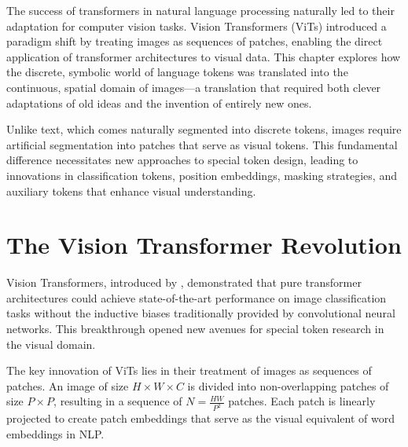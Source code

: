 
The success of transformers in natural language processing naturally led to their adaptation for computer vision tasks. Vision Transformers (ViTs) introduced a paradigm shift by treating images as sequences of patches, enabling the direct application of transformer architectures to visual data. This chapter explores how the discrete, symbolic world of language tokens was translated into the continuous, spatial domain of images---a translation that required both clever adaptations of old ideas and the invention of entirely new ones.
\begin{comment}
Feedback: This is a strong start. To make the core challenge more vivid, you could add a sentence like: "This chapter explores how the discrete, symbolic world of language tokens was translated into the continuous, spatial domain of images, a translation that required both clever adaptations of old ideas and the invention of entirely new ones."

STATUS: addressed - added sentence highlighting the challenge of translating discrete language concepts to continuous visual domain
\end{comment}

Unlike text, which comes naturally segmented into discrete tokens, images require artificial segmentation into patches that serve as visual tokens. This fundamental difference necessitates new approaches to special token design, leading to innovations in classification tokens, position embeddings, masking strategies, and auxiliary tokens that enhance visual understanding.

\section{The Vision Transformer Revolution}

Vision Transformers, introduced by \citet{dosovitskiy2020image}, demonstrated that pure transformer architectures could achieve state-of-the-art performance on image classification tasks without the inductive biases traditionally provided by convolutional neural networks. This breakthrough opened new avenues for special token research in the visual domain.

The key innovation of ViTs lies in their treatment of images as sequences of patches. An image of size $H \times W \times C$ is divided into non-overlapping patches of size $P \times P$, resulting in a sequence of $N = \frac{HW}{P^2}$ patches. Each patch is linearly projected to create patch embeddings that serve as the visual equivalent of word embeddings in NLP.

